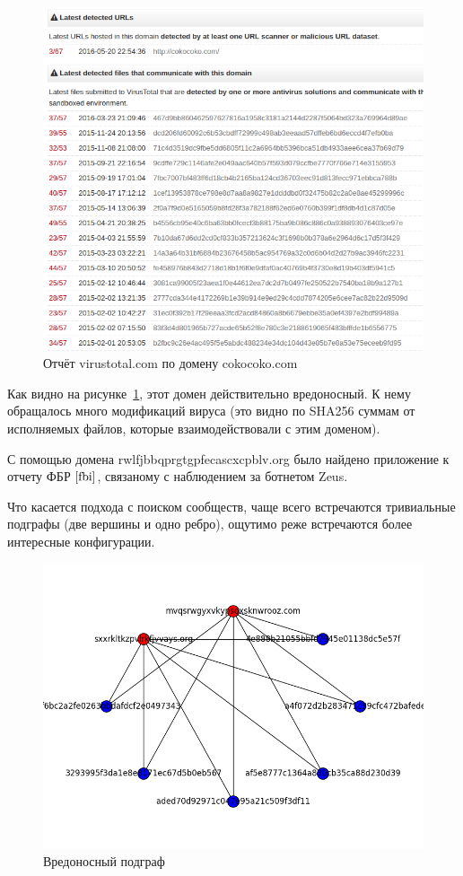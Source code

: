 \documentclass[14pt]{extreport} %
\begin{document}
\begin{figure}[H]
	\centering
	\includegraphics[scale=0.7]{vt-detect.png}
	\caption{Отчёт virustotal.com по домену cokocoko.com}
	\label{fig:vt}
\end{figure}

Как видно на рисунке~\ref{fig:vt}, этот домен действительно вредоносный. К нему обращалось много модификаций вируса (это видно по SHA256 суммам от исполняемых файлов, которые взаимодействовали с этим доменом).

С помощью домена rwlfjbbqprgtgpfecascxcpblv.org было найдено приложение к отчету ФБР $\cite{fbi}$, связаному с наблюдением за ботнетом Zeus.

\newpage
Что касается подхода с поиском сообществ, чаще всего встречаются тривиальные подграфы (две вершины и одно ребро), ощутимо реже встречаются более интересные конфигурации.
\begin{figure}[H]
	\centering
	\includegraphics[scale=0.7]{mal-graph.png}
	\caption{Вредоносный подграф}
	\label{fig:mal-graph}
\end{figure}
\end{document}
